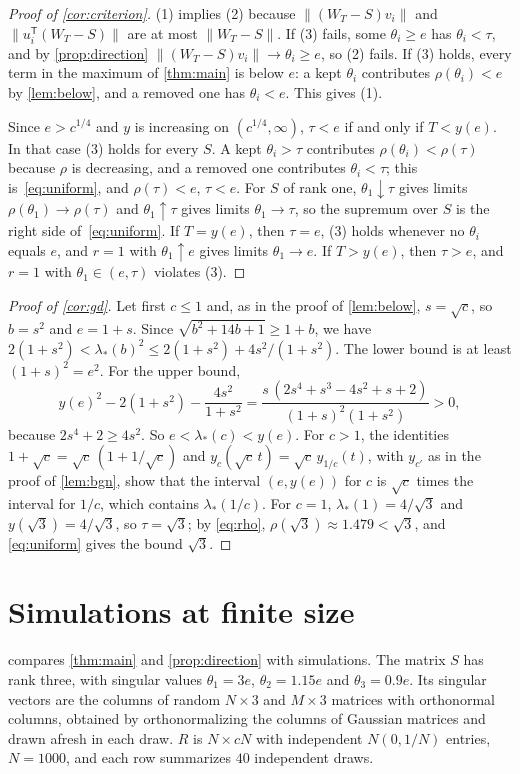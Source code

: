 \documentclass[11pt]{amsart}
\theoremstyle{remark}
\numberwithin{equation}{section}
\begin{document}
\begin{proof}[Proof of \cref{cor:criterion}]
(1) implies (2) because $\|(W_T-S)v_i\|$ and $\|u_i^{\mathsf T}(W_T-S)\|$ are at most $\|W_T-S\|$. If (3) fails, some $\theta_i\ge e$ has $\theta_i<\tau$, and by \cref{prop:direction} $\|(W_T-S)v_i\|\to\theta_i\ge e$, so (2) fails. If (3) holds, every term in the maximum of \cref{thm:main} is below $e$: a kept $\theta_i$ contributes $\rho(\theta_i)<e$ by \cref{lem:below}, and a removed one has $\theta_i<e$. This gives (1).

Since $e>c^{1/4}$ and $y$ is increasing on $(c^{1/4},\infty)$, $\tau<e$ if and only if $T<y(e)$. In that case (3) holds for every $S$. A kept $\theta_i>\tau$ contributes $\rho(\theta_i)<\rho(\tau)$ because $\rho$ is decreasing, and a removed one contributes $\theta_i<\tau$; this is~\eqref{eq:uniform}, and $\rho(\tau)<e$, $\tau<e$. For $S$ of rank one, $\theta_1\downarrow\tau$ gives limits $\rho(\theta_1)\to\rho(\tau)$ and $\theta_1\uparrow\tau$ gives limits $\theta_1\to\tau$, so the supremum over $S$ is the right side of~\eqref{eq:uniform}. If $T=y(e)$, then $\tau=e$, (3) holds whenever no $\theta_i$ equals $e$, and $r=1$ with $\theta_1\uparrow e$ gives limits $\theta_1\to e$. If $T>y(e)$, then $\tau>e$, and $r=1$ with $\theta_1\in(e,\tau)$ violates (3).
\end{proof}

\begin{proof}[Proof of \cref{cor:gd}]
Let first $c\le1$ and, as in the proof of \cref{lem:below}, $s=\sqrt c$, so $b=s^2$ and $e=1+s$. Since $\sqrt{b^2+14b+1}\ge1+b$, we have $2(1+s^2)<\lambda_*(b)^2\le2(1+s^2)+4s^2/(1+s^2)$. The lower bound is at least $(1+s)^2=e^2$. For the upper bound,
\[
y(e)^2-2(1+s^2)-\frac{4s^2}{1+s^2}=\frac{s\,(2s^4+s^3-4s^2+s+2)}{(1+s)^2(1+s^2)}>0,
\]
because $2s^4+2\ge4s^2$. So $e<\lambda_*(c)<y(e)$. For $c>1$, the identities $1+\sqrt c=\sqrt c\,(1+1/\sqrt c)$ and $y_c(\sqrt c\,t)=\sqrt c\,y_{1/c}(t)$, with $y_{c'}$ as in the proof of \cref{lem:bgn}, show that the interval $(e,y(e))$ for $c$ is $\sqrt c$ times the interval for $1/c$, which contains $\lambda_*(1/c)$. For $c=1$, $\lambda_*(1)=4/\sqrt3$ and $y(\sqrt3)=4/\sqrt3$, so $\tau=\sqrt3$; by \eqref{eq:rho}, $\rho(\sqrt3)\approx1.479<\sqrt3$, and \eqref{eq:uniform} gives the bound $\sqrt3$.
\end{proof}

\section{Simulations at finite size}\label{sec:numerics}
 compares \cref{thm:main} and \cref{prop:direction} with simulations. The matrix $S$ has rank three, with singular values $\theta_1=3e$, $\theta_2=1.15e$ and $\theta_3=0.9e$. Its singular vectors are the columns of random $N\times3$ and $M\times3$ matrices with orthonormal columns, obtained by orthonormalizing the columns of Gaussian matrices and drawn afresh in each draw. $R$ is $N\times cN$ with independent $N(0,1/N)$ entries, $N=1000$, and each row summarizes $40$ independent draws.
\end{document}
